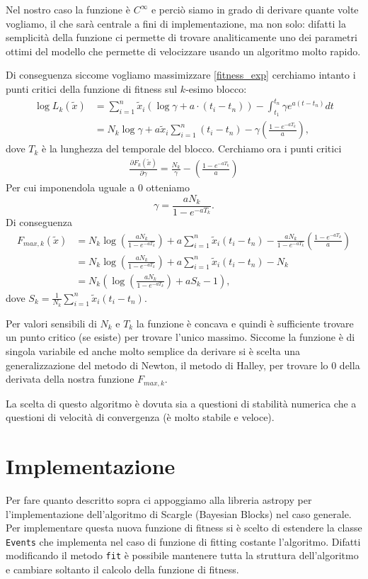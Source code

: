 \documentclass[10pt,a4paper]{report}
\begin{document}
Nel nostro caso la funzione è $C^{\infty}$ e perciò siamo in grado di derivare quante volte vogliamo, il che sarà centrale a fini di implementazione, ma non solo: difatti la semplicità della funzione ci permette di trovare analiticamente uno dei parametri ottimi del modello che permette di velocizzare usando un algoritmo molto rapido.

Di conseguenza siccome vogliamo massimizzare \eqref{fitness_exp} cerchiamo intanto i punti critici della funzione di fitness sul $k$-esimo blocco:
\begin{align*}
\log L_k(\tilde{x}) &= \sum_{i=1}^n\tilde{x}_i(\log\gamma + a\cdot(t_i-t_n)) -\int_{t_1}^{t_n}\gamma e^{a(t-t_n)} dt\\
&=N_k\log\gamma + a\tilde{x}_i\sum_{i=1}^n(t_i-t_n)-\gamma\left(\frac{1-e^{-aT_k}}{a}\right),
\end{align*}
dove $T_k$ è la lunghezza del temporale del blocco. Cerchiamo ora i punti critici
\begin{align*}
\frac{\partial F_k(\tilde{x})}{\partial \gamma} = \frac{N_k}{\gamma} - \left(\frac{1-e^{-aT_k}}{a}\right)
\end{align*}
Per cui imponendola uguale a $0$ otteniamo 
$$
\gamma = \frac{aN_k}{1-e^{-aT_k}}.
$$
Di conseguenza
\begin{align}\nonumber
F_{max,k}(\tilde{x}) &= N_k\log\left(\frac{aN_k}{1-e^{-aT_k}}\right) + a\sum_{i=1}^n\tilde{x}_i(t_i-t_n)-\frac{aN_k}{1-e^{-aT_k}}\left(\frac{1-e^{-aT_k}}{a}\right)\\ \nonumber
&= N_k\log\left(\frac{aN_k}{1-e^{-aT_k}}\right) + a\sum_{i=1}^n\tilde{x}_i(t_i-t_n)-N_k\\
&= N_k\left(\log\left(\frac{aN_k}{1-e^{-aT_k}}\right) + aS_k-1\right),\label{our_loglikel}
\end{align}
dove $S_k = \frac{1}{N_k}\sum_{i=1}^n\tilde{x}_i(t_i-t_n)$. 

Per valori sensibili di $N_k$ e $T_k$ la funzione è concava e quindi è sufficiente trovare un punto critico (se esiste) per trovare l'unico massimo. Siccome la funzione è di singola variabile ed anche molto semplice da derivare si è scelta una generalizzazione del metodo di Newton, il metodo di Halley, per trovare lo $0$ della derivata della nostra funzione $F_{max,k}$.

La scelta di questo algoritmo è dovuta sia a questioni di stabilità numerica che a questioni di velocità di convergenza (è molto stabile e veloce).
\section{Implementazione}
Per fare quanto descritto sopra ci appoggiamo alla libreria astropy per l'implementazione dell'algoritmo di Scargle (Bayesian Blocks) nel caso generale. Per implementare questa nuova funzione di fitness si è scelto di estendere la classe \texttt{Events} che implementa nel caso di funzione di fitting costante l'algoritmo. Difatti modificando il metodo \texttt{fit} è possibile mantenere tutta la struttura dell'algoritmo e cambiare soltanto il calcolo della funzione di fitness.
\end{document}
